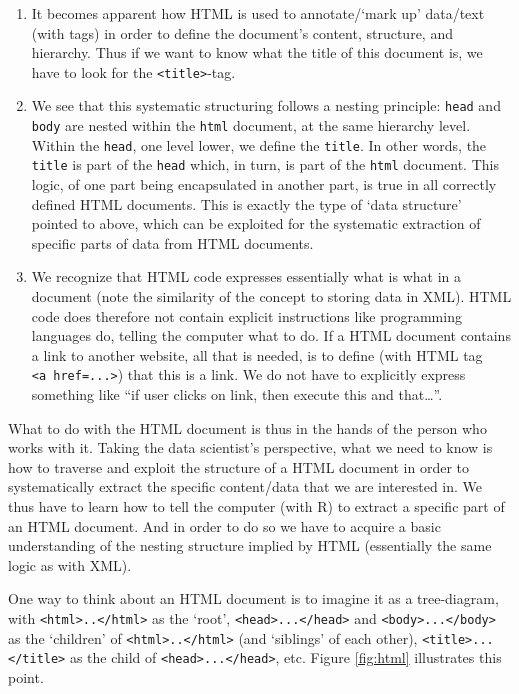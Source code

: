 \documentclass[
  12pt,
]{style/krantz}
\providecommand{\tightlist}{%
  \setlength{\itemsep}{0pt}\setlength{\parskip}{0pt}}
\begin{document}
\begin{enumerate}
\def\labelenumi{\arabic{enumi}.}
\tightlist
\item
  It becomes apparent how HTML is used to annotate/`mark up' data/text (with tags) in order to define the document's content, structure, and hierarchy. Thus if we want to know what the title of this document is, we have to look for the \texttt{\textless{}title\textgreater{}}-tag.
\item
  We see that this systematic structuring follows a nesting principle: \texttt{head} and \texttt{body} are nested within the \texttt{html} document, at the same hierarchy level. Within the \texttt{head}, one level lower, we define the \texttt{title}. In other words, the \texttt{title} is part of the \texttt{head} which, in turn, is part of the \texttt{html} document. This logic, of one part being encapsulated in another part, is true in all correctly defined HTML documents. This is exactly the type of `data structure' pointed to above, which can be exploited for the systematic extraction of specific parts of data from HTML documents.
\item
  We recognize that HTML code expresses essentially what is what in a document (note the similarity of the concept to storing data in XML). HTML code does therefore not contain explicit instructions like programming languages do, telling the computer what to do. If a HTML document contains a link to another website, all that is needed, is to define (with HTML tag \texttt{\textless{}a\ href=...\textgreater{}}) that this is a link. We do not have to explicitly express something like ``if user clicks on link, then execute this and that\ldots{}''.
\end{enumerate}

What to do with the HTML document is thus in the hands of the person who works with it. Taking the data scientist's perspective, what we need to know is how to traverse and exploit the structure of a HTML document in order to systematically extract the specific content/data that we are interested in. We thus have to learn how to tell the computer (with R) to extract a specific part of an HTML document. And in order to do so we have to acquire a basic understanding of the nesting structure implied by HTML (essentially the same logic as with XML).

One way to think about an HTML document is to imagine it as a tree-diagram, with \texttt{\textless{}html\textgreater{}..\textless{}/html\textgreater{}} as the `root', \texttt{\textless{}head\textgreater{}...\textless{}/head\textgreater{}} and \texttt{\textless{}body\textgreater{}...\textless{}/body\textgreater{}} as the `children' of \texttt{\textless{}html\textgreater{}..\textless{}/html\textgreater{}} (and `siblings' of each other), \texttt{\textless{}title\textgreater{}...\textless{}/title\textgreater{}} as the child of \texttt{\textless{}head\textgreater{}...\textless{}/head\textgreater{}}, etc. Figure \ref{fig:html} illustrates this point.
\end{document}
